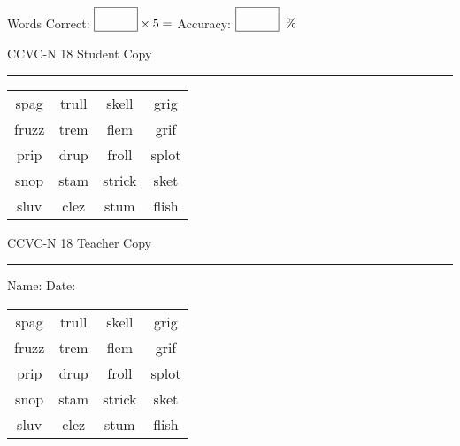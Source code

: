 \documentclass{memoir}
\begin{document}
\small

Words Correct: $\fbox{\phantom{\huge 100}} \times 5 = $ Accuracy: $\fbox{\phantom{\huge 100}}\;\; \%$ 

\vfill

\newpage


\footnotesize \noindent
CCVC-N 18 \hfill Student Copy
\smallskip
\hrule

\Large

\setlength{\tabcolsep}{14pt}
\def\arraystretch{3}

{\selectfont


\begin{vplace}[0.5]
\begin{center}
\begin{tabular}{cccc}
spag          & trull & skell & grig      \\
fruzz & trem & flem & grif      \\
prip & drup & froll & splot \\
snop & stam            & strick & sket \\
sluv & clez & stum & flish             \\
\end{tabular}
\end{center}
\end{vplace}

}

\newpage

\footnotesize \noindent
CCVC-N 18 \hfill Teacher Copy
\smallskip
\hrule

\small

\vfill

\noindent
Name: \underline{\hspace{1.75in}} \hfill Date: \underline{\hspace{1in}}

\Large

{\selectfont


\begin{vplace}[0.5]
\begin{center}
\begin{tabular}{cccc}
spag          & trull & skell & grig      \\
fruzz & trem & flem & grif      \\
prip & drup & froll & splot \\
snop & stam            & strick & sket \\
sluv & clez & stum & flish             \\
\end{tabular}
\end{center}
\end{vplace}



}
\end{document}
